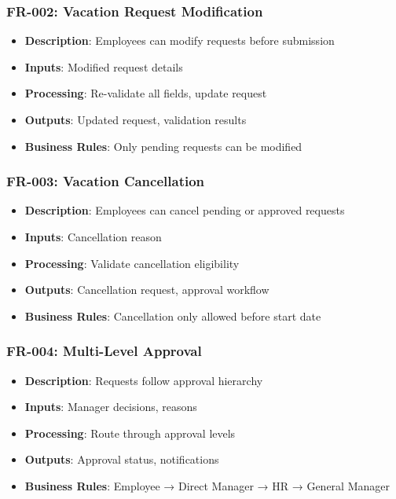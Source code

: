 \documentclass[12pt,a4paper]{article}
\begin{document}
\subsubsection{FR-002: Vacation Request Modification}
\begin{itemize}
    \item \textbf{Description}: Employees can modify requests before submission
    \item \textbf{Inputs}: Modified request details
    \item \textbf{Processing}: Re-validate all fields, update request
    \item \textbf{Outputs}: Updated request, validation results
    \item \textbf{Business Rules}: Only pending requests can be modified
\end{itemize}

\subsubsection{FR-003: Vacation Cancellation}
\begin{itemize}
    \item \textbf{Description}: Employees can cancel pending or approved requests
    \item \textbf{Inputs}: Cancellation reason
    \item \textbf{Processing}: Validate cancellation eligibility
    \item \textbf{Outputs}: Cancellation request, approval workflow
    \item \textbf{Business Rules}: Cancellation only allowed before start date
\end{itemize}

\subsubsection{FR-004: Multi-Level Approval}
\begin{itemize}
    \item \textbf{Description}: Requests follow approval hierarchy
    \item \textbf{Inputs}: Manager decisions, reasons
    \item \textbf{Processing}: Route through approval levels
    \item \textbf{Outputs}: Approval status, notifications
    \item \textbf{Business Rules}: Employee → Direct Manager → HR → General Manager
\end{itemize}
\end{document}
